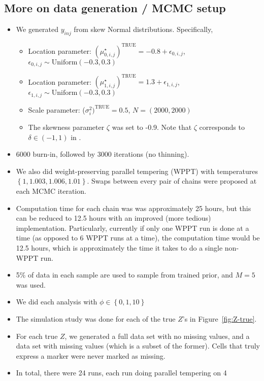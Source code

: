 \documentclass[10pt]{article} %
\newcommand{\p}[1]{\left(#1\right)}
\newcommand{\bc}[1]{ \left\{#1\right\} }
\newcommand{\Uniform}{ \text{Uniform} }
\def\true{\text{TRUE}}
\begin{document}
\subsection{More on data generation / MCMC setup}
\begin{itemize}
  \item We generated $y_{inj}$ from skew Normal distributions. Specifically,
  \begin{itemize}
    \item Location parameter: $(\mu_{0,i,j}^\star)^\true=-0.8 + \epsilon_{0,i,j}$, $\epsilon_{0,i,j} \sim \Uniform(-0.3, 0.3)$
    \item Location parameter: $(\mu_{1,i,j}^\star)^\true=1.3 + \epsilon_{1,i,j}$, $\epsilon_{1,i,j} \sim \Uniform(-0.3, 0.3)$
    \item Scale parameter: ($\sigma^2_i)^\true=0.5$, $N=(2000, 2000)$
    \item The skewness parameter $\zeta$ was set to -0.9. Note that $\zeta$
          corresponds to $\delta \in \p{-1, 1}$ in \cite{fruhwirth2010bayesian}.
  \end{itemize}
  \item 6000 burn-in, followed by 3000 iterations (no thinning).
  \item We also did weight-preserving parallel tempering (WPPT) with temperatures 
        $\bc{1, 1.003, 1.006, 1.01}$. Swaps between every pair of chains were
        proposed at each MCMC iteration.
  \item Computation time for each chain was was approximately 25 hours, but this can
        be reduced to 12.5 hours with an improved (more tedious) implementation.
        Particularly, currently if only one WPPT run is done at a time (as opposed
        to 6 WPPT runs at a time), the computation time would be 12.5 hours, which
        is approximately the time it takes to do a single non-WPPT run.
  \item 5\% of data in each sample are used to sample from trained prior, and
    $M=5$ was used.
  \item We did each analysis with $\phi \in \bc{0, 1, 10}$
  \item The simulation study was done for each of the true $Z$'s in 
        Figure~\ref{fig:Z-true}.
  \item For each true $Z$, we generated a full data set with no missing values,
        and a data set with missing values (which is a subset of the former). Cells
        that truly express a marker were never marked as missing.
  \item In total, there were 24 runs, each run doing parallel tempering on 4

\end{itemize}
\end{document}

